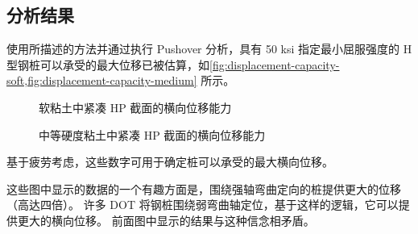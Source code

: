 \subsection{分析结果}

使用所描述的方法并通过执行 Pushover 分析，具有 50 ksi 指定最小屈服强度的 H 型钢桩可以承受的最大位移已被估算，如\cref{fig:displacement-capacity-soft,fig:displacement-capacity-medium} 所示。

\begin{figure}
  \caption{软粘土中紧凑 HP 截面的横向位移能力}
  \label{fig:displacement-capacity-soft}
\end{figure}

\begin{figure}
  \caption{中等硬度粘土中紧凑 HP 截面的横向位移能力}
  \label{fig:displacement-capacity-medium}
\end{figure}

基于疲劳考虑，这些数字可用于确定桩可以承受的最大横向位移。

这些图中显示的数据的一个有趣方面是，围绕强轴弯曲定向的桩提供更大的位移（高达四倍）。 许多 DOT 将钢桩围绕弱弯曲轴定位，基于这样的逻辑，它可以提供更大的横向位移。 前面图中显示的结果与这种信念相矛盾。
